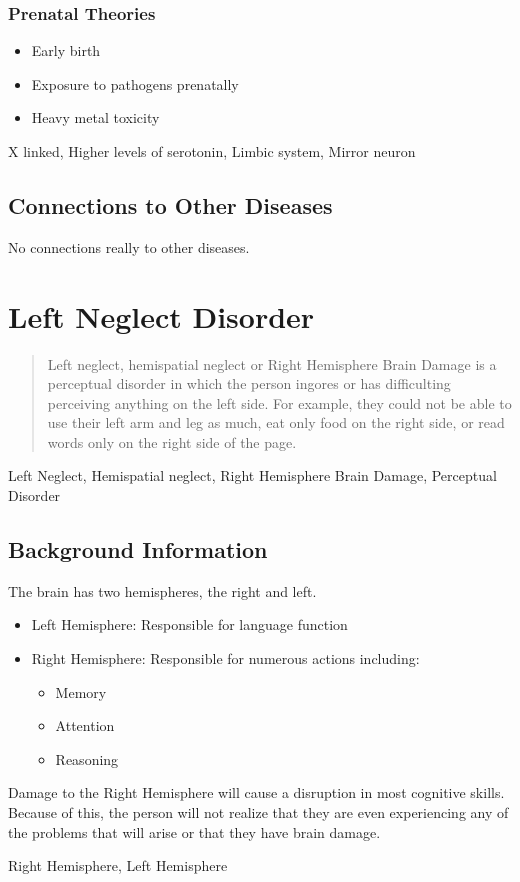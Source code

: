 \documentclass[journal]{IEEEtran}
\begin{document}
\subsubsection{Prenatal Theories}
\begin{itemize}
\item Early birth
\item Exposure to pathogens prenatally
\item Heavy metal toxicity
\end{itemize}
\begin{IEEEkeywords}
X linked, Higher levels of serotonin, Limbic system, Mirror neuron
\end{IEEEkeywords}
\subsection{Connections to Other Diseases}
No connections really to other diseases.
\section{Left Neglect Disorder}
\begin{abstract}
Left neglect, hemispatial neglect or Right Hemisphere Brain Damage is a perceptual disorder in which the person ingores or has difficulting perceiving anything on the left side. For example, they could not be able to use their left arm and leg as much, eat only food on the right side, or read words only on the right side of the page.
\end{abstract}
\begin{IEEEkeywords}
Left Neglect, Hemispatial neglect, Right Hemisphere Brain Damage, Perceptual Disorder
\end{IEEEkeywords}
\subsection{Background Information}
The brain has two hemispheres, the right and left.
\begin{itemize}
\item Left Hemisphere: Responsible for language function
\item Right Hemisphere: Responsible for numerous actions including:
\begin{itemize}
\item Memory
\item Attention
\item Reasoning
\end{itemize}
\end{itemize}
Damage to the Right Hemisphere will cause a disruption in most cognitive skills. Because of this, the person will not realize that they are even experiencing any of the problems that will arise or that they have brain damage.
\begin{IEEEkeywords}
Right Hemisphere, Left Hemisphere
\end{IEEEkeywords}
\end{document}
